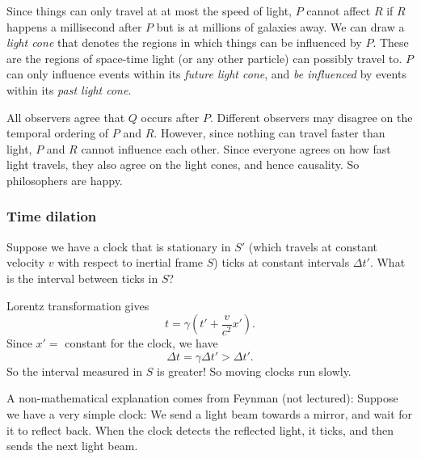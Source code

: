 \documentclass[a4paper]{article}
\begin{document}
Since things can only travel at at most the speed of light, $P$ cannot affect $R$ if $R$ happens a millisecond after $P$ but is at millions of galaxies away. We can draw a \emph{light cone} that denotes the regions in which things can be influenced by $P$. These are the regions of space-time light (or any other particle) can possibly travel to. $P$ can only influence events within its \emph{future light cone}, and \emph{be influenced} by events within its \emph{past light cone}.

\begin{center}
\end{center}

All observers agree that $Q$ occurs after $P$. Different observers may disagree on the temporal ordering of $P$ and $R$. However, since nothing can travel faster than light, $P$ and $R$ cannot influence each other. Since everyone agrees on how fast light travels, they also agree on the light cones, and hence causality. So philosophers are happy.

\subsubsection*{Time dilation}
Suppose we have a clock that is stationary in $S'$ (which travels at constant velocity $v$ with respect to inertial frame $S$) ticks at constant intervals $\Delta t'$. What is the interval between ticks in $S$?

Lorentz transformation gives
\[
  t = \gamma\left(t' + \frac{v}{c^2}x'\right).
\]
Since $x' =$ constant for the clock, we have
\[
  \Delta t = \gamma \Delta t' > \Delta t'.
\]
So the interval measured in $S$ is greater! So moving clocks run slowly.

A non-mathematical explanation comes from Feynman (not lectured): Suppose we have a very simple clock: We send a light beam towards a mirror, and wait for it to reflect back. When the clock detects the reflected light, it ticks, and then sends the next light beam.
\end{document}
